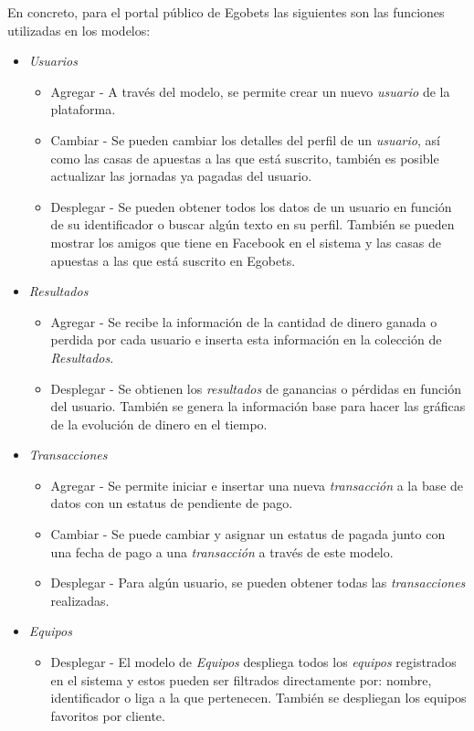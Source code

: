		En concreto, para el portal público de Egobets las siguientes son las funciones utilizadas en los modelos:
		\begin{itemize}
			\item \emph{Usuarios}
				\begin{itemize}
					\item Agregar - A través del modelo, se permite crear un nuevo \emph{usuario} de la plataforma.
					\item Cambiar - Se pueden cambiar los detalles del perfil de un \emph{usuario}, así como las casas de apuestas a las que está suscrito, también es posible actualizar las jornadas ya pagadas del usuario.
					\item Desplegar - Se pueden obtener todos los datos de un usuario en función de su identificador o buscar algún texto en su perfil. También se pueden mostrar los amigos que tiene en Facebook \cite{facebookDocuWeb} en el sistema y las casas de apuestas a las que está suscrito en Egobets.
				\end{itemize}
			\item \emph{Resultados}
			\begin{itemize}
				\item Agregar - Se recibe la información de la cantidad de dinero ganada o perdida por cada usuario e inserta esta información en la colección de \emph{Resultados}.
				\item Desplegar - Se obtienen los \emph{resultados} de ganancias o pérdidas en función del usuario. También se genera la información base para hacer las gráficas de la evolución de dinero en el tiempo.
			\end{itemize}
			\item \emph{Transacciones}
				\begin{itemize}
					\item Agregar - Se permite iniciar e insertar una nueva \emph{transacción} a la base de datos con un estatus de pendiente de pago.
					\item Cambiar - Se puede cambiar y asignar un estatus de pagada junto con una fecha de pago a una \emph{transacción} a través de este modelo.
					\item Desplegar - Para algún usuario, se pueden obtener todas las \emph{transacciones} realizadas.
				\end{itemize}
			\item \emph{Equipos}
				\begin{itemize}
					\item Desplegar - El modelo  de \emph{Equipos} despliega todos los \emph{equipos} registrados en el sistema y estos pueden ser filtrados directamente por:  nombre, identificador o liga a la que pertenecen. También se despliegan los equipos favoritos por cliente.

\end{itemize}
\end{itemize}
